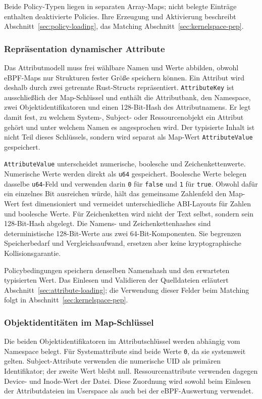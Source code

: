 Beide Policy-Typen liegen in separaten Array-Maps; nicht belegte Einträge enthalten deaktivierte Policies. Ihre Erzeugung und Aktivierung beschreibt Abschnitt~\ref{sec:policy-loading}, das Matching Abschnitt~\ref{sec:kernelspace-pep}.

\subsubsection{Repräsentation dynamischer Attribute}
Das Attributmodell muss frei wählbare Namen und Werte abbilden, obwohl eBPF-Maps nur Strukturen fester Größe speichern können. Ein Attribut wird deshalb durch zwei getrennte Rust-Structs repräsentiert. \texttt{AttributeKey} ist ausschließlich der Map-Schlüssel und enthält die Attributbank, den Namespace, zwei Objektidentifikatoren und einen 128-Bit-Hash des Attributnamens. Er legt damit fest, zu welchem System-, Subject- oder Ressourcenobjekt ein Attribut gehört und unter welchem Namen es angesprochen wird. Der typisierte Inhalt ist nicht Teil dieses Schlüssels, sondern wird separat als Map-Wert \texttt{AttributeValue} gespeichert.

\texttt{AttributeValue} unterscheidet numerische, boolesche und Zeichenkettenwerte. Numerische Werte werden direkt als \texttt{u64} gespeichert. Boolesche Werte belegen dasselbe \texttt{u64}-Feld und verwenden darin \texttt{0} für \texttt{false} und \texttt{1} für \texttt{true}. Obwohl dafür ein einzelnes Bit ausreichen würde, hält das gemeinsame Zahlenfeld den Map-Wert fest dimensioniert und vermeidet unterschiedliche ABI-Layouts für Zahlen und boolesche Werte. Für Zeichenketten wird nicht der Text selbst, sondern sein 128-Bit-Hash abgelegt. Die Namens- und Zeichenkettenhashes sind deterministische 128-Bit-Werte aus zwei 64-Bit-Komponenten. Sie begrenzen Speicherbedarf und Vergleichsaufwand, ersetzen aber keine kryptographische Kollisionsgarantie.

Policybedingungen speichern denselben Namenshash und den erwarteten typisierten Wert. Das Einlesen und Validieren der Quelldateien erläutert Abschnitt~\ref{sec:attribute-loading}; die Verwendung dieser Felder beim Matching folgt in Abschnitt~\ref{sec:kernelspace-pep}.

\subsubsection{Objektidentitäten im Map-Schlüssel}
Die beiden Objektidentifikatoren im Attributschlüssel werden abhängig vom Namespace belegt. Für Systemattribute sind beide Werte \texttt{0}, da sie systemweit gelten. Subject-Attribute verwenden die numerische UID als primären Identifikator; der zweite Wert bleibt null. Ressourcenattribute verwenden dagegen Device- und Inode-Wert der Datei. Diese Zuordnung wird sowohl beim Einlesen der Attributdateien im Userspace als auch bei der eBPF-Auswertung verwendet.

